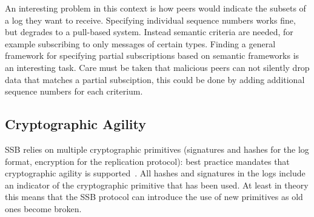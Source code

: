 \documentclass[9pt,sigconf]{acmart}
\begin{document}
An interesting problem in this context is how peers would indicate the subsets of a log they want to receive. Specifying individual sequence numbers works fine, but degrades to a pull-based system. Instead semantic criteria are needed, for example subscribing to only messages of certain types. Finding a general framework for specifying partial subscriptions based on semantic frameworks is an interesting task. Care must be taken that malicious peers can not silently drop data that matches a partial subsciption, this could be done by adding additional sequence numbers for each criterium.
%
%
%



\subsection{Cryptographic Agility}


SSB relies on multiple cryptographic primitives (signatures and hashes for the log format, encryption for the replication protocol): best practice mandates that cryptographic agility is supported~\cite{nelson2011crypto}. All hashes and signatures in the logs include an indicator of the cryptographic primitive that has been used. At least in theory this means that the SSB protocol can introduce the use of new primitives as old ones become broken.
\end{document}
